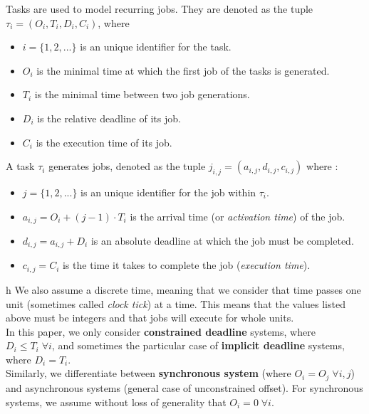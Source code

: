 \documentclass[a4paper,10pt]{article}
\begin{document}
        Tasks are used to model recurring jobs. They are denoted as the tuple $\tau_i = (O_i, T_i, D_i, C_i)$, where
        \begin{itemize}
            \item $i = \{1,2,...\}$ is an unique identifier for the task.
            \item $O_i$ is the minimal time at which the first job of the tasks is generated.
            \item $T_i$ is the minimal time between two job generations.
            \item $D_i$ is the relative deadline of its job.
            \item $C_i$ is the execution time of its job.
        \end{itemize}

        A task $\tau_i$ generates jobs, denoted as the tuple $j_{i,j} = (a_{i, j}, d_{i,j}, c_{i,j})$ where :
        \begin{itemize}
            \item $j = \{1,2,...\}$ is an unique identifier for the job within $\tau_i$.
            \item $a_{i,j} = O_i + (j-1) \cdot T_i$ is the arrival time (or \emph{activation time}) of the job.
            \item $d_{i,j} = a_{i,j} + D_i$ is an absolute deadline at which the job must be completed.
            \item $c_{i,j} = C_i$ is the time it takes to complete the job (\emph{execution time}).
        \end{itemize}
h
        We also assume a discrete time, meaning that we consider that time passes one unit (sometimes called \emph{clock tick}) at a time. This means that the values listed above must be integers and that jobs will execute for whole units.\\

        In this paper, we only consider \textbf{constrained deadline} systems, where $D_i \leqslant T_i \; \forall i$, and sometimes the particular case of \textbf{implicit deadline} systems, where $D_i = T_i$.\\

        Similarly, we differentiate between \textbf{synchronous system} (where $O_i = O_j \; \forall i,j$) and asynchronous systems (general case of unconstrained offset). For synchronous systems, we assume without loss of generality that $O_i = 0 \; \forall i$.\\
\end{document}
